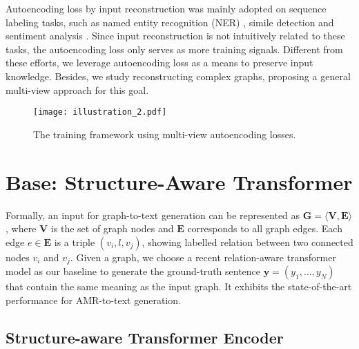 \documentclass[11pt,a4paper]{article}
\begin{document}
Autoencoding loss by input reconstruction was mainly adopted on sequence labeling tasks, such as named entity recognition (NER) \citep{rei2017semi,liu2018empower,jia2019cross}, simile detection \citep{liu2018neural} and sentiment analysis \citep{rei2019jointly}.
Since input reconstruction is not intuitively related to these tasks, the autoencoding loss only serves as more training signals.
Different from these efforts, we leverage autoencoding loss as a means to preserve input knowledge.
Besides, we study reconstructing complex graphs, proposing a general multi-view approach for this goal.





\begin{figure*}
    \centering
    \texttt{[image: illustration\_2.pdf]}
    \caption{The training framework using multi-view autoencoding losses.}
    \label{fig:model}
\end{figure*}


\section{Base: Structure-Aware Transformer}
\label{sec:baseline}


Formally, an input for graph-to-text generation can be represented as $\boldsymbol{G}=\langle \boldsymbol{V}, \boldsymbol{E}\rangle$, where $\boldsymbol{V}$ is the set of graph nodes and $\boldsymbol{E}$ corresponds to all graph edges.
Each edge $e\in\boldsymbol{E}$ is a triple $(v_i,l,v_j)$, showing labelled relation between two connected nodes $v_i$ and $v_j$.
Given a graph, we choose a recent relation-aware transformer model \citep{zhu2019modeling} as our baseline to generate the ground-truth sentence $\boldsymbol{y}=(y_1,\dots,y_N)$ that contain the same meaning as the input graph.
It exhibits the state-of-the-art performance for AMR-to-text generation.


\subsection{Structure-aware Transformer Encoder}
\end{document}
